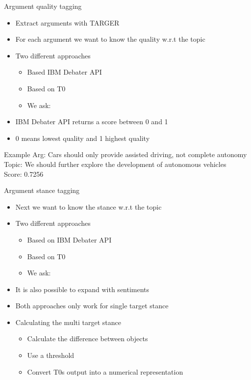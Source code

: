 \documentclass[english]{mlutalk}
\begin{document}
\begin{frame}{Argument quality tagging}
    \begin{itemize}
        \item Extract arguments with TARGER~\cite{ChernodubOHBHBP2019}
        \item For each argument we want to know the quality w.r.t the topic
        \item Two different approaches
        \begin{itemize}
            \item Based IBM Debater API~\cite{ToledoG2019}
            \item Based on T0
            \item We ask: 
        \end{itemize}
        \item IBM Debater API returns a score between 0 and 1
        \item 0 means lowest quality and 1 highest quality
    \end{itemize}
    \begin{block}{Example}
        Arg: Cars should only provide assisted driving, not complete autonomy\\
        Topic: We should further explore the development of autonomous vehicles\\ 
        Score: 0.7256
    \end{block}
\end{frame}

\begin{frame}{Argument stance tagging}
    \begin{itemize}
        \item Next we want to know the stance w.r.t the topic
        \item Two different approaches
        \begin{itemize}
            \item Based on IBM Debater API~\cite{BarHaimBDSS2017}
            \item Based on T0
            \item We ask: 
        \end{itemize}
        \item It is also possible to expand with sentiments
        \item Both approaches only work for single target stance
        \item Calculating the multi target stance
        \begin{itemize}
            \item Calculate the difference between objects
            \item Use a threshold
            \item Convert T0s output into a numerical representation
        \end{itemize}
    \end{itemize}
\end{frame}
\end{document}
